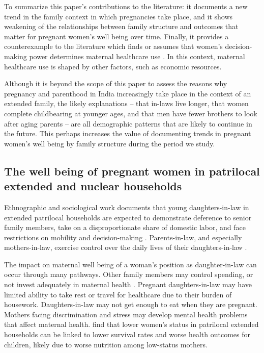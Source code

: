 \documentclass[12pt]{article}
\begin{document}
To summarize this paper's contributions to the literature: it documents a new trend in the family context in which pregnancies take place, and it shows weakening of the relationships between family structure and outcomes that matter for pregnant women's well being over time.  Finally, it provides a counterexample to the literature which finds or assumes that women's decision-making power determines maternal healthcare use \citep{majumder2024does,mistry2009women}.  In this context, maternal healthcare use is shaped by other factors, such as economic resources.  

Although it is beyond the scope of this paper to assess the reasons why pregnancy and parenthood in India increasingly take place in the context of an extended family, the likely explanations -- that in-laws live longer, that women complete childbearing at younger ages, and that men have fewer brothers to look after aging parents -- are all demographic patterns that are likely to continue in the future.  This perhaps increases the value of documenting trends in pregnant women's well being by family structure during the period we study.

\subsection*{The well being of pregnant women in patrilocal extended and nuclear households}

Ethnographic and sociological work documents that young daughters-in-law in extended patrilocal households are expected to demonstrate deference to senior family members, take on a disproportionate share of domestic labor, and face restrictions on mobility and decision-making \citep{mandelbaum1988women, jeffery1989labour, gupta1999lifeboat}.  Parents-in-law, and especially mothers-in-law, exercise control over the daily lives of their daughters-in-law \citep{desai2005women, bloom2001dimensions}. 

The impact on maternal well being of a woman's position as daughter-in-law can occur through many pathways. Other family members may control spending, or not invest adequately in maternal health \citep{ganle2015intra,raj2011abuse}. Pregnant daughters-in-law may have limited ability to take rest or travel for healthcare due to their burden of housework. Daughters-in-law may not get enough to eat when they are pregnant. Mothers facing discrimination and stress may develop mental health problems that affect maternal health. \cite{coffey2022mothers} find that lower women’s status in patrilocal extended households can be linked to lower survival rates and worse health outcomes for children, likely due to worse nutrition among low-status mothers.
\end{document}
